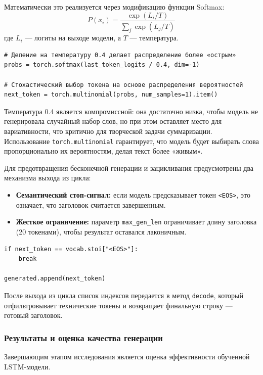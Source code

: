 \documentclass[coursework]{SCWorks}
\begin{document}
    Математически это реализуется через модификацию функции Softmax:
    \[ P(x_i) = \frac{\exp(L_i / T)}{\sum_{j} \exp(L_j / T)} \]
    где $L_i$ — логиты на выходе модели, а $T$ — температура.

    \begin{verbatim}
# Деление на температуру 0.4 делает распределение более «острым»
probs = torch.softmax(last_token_logits / 0.4, dim=-1)

# Стохастический выбор токена на основе распределения вероятностей
next_token = torch.multinomial(probs, num_samples=1).item()
    \end{verbatim}

    Температура 0.4 является компромиссной: она достаточно низка, чтобы модель не генерировала случайный набор слов,
    но при этом оставляет место для вариативности, что критично для творческой задачи суммаризации.
    Использование \texttt{torch.multinomial} гарантирует, что модель будет выбирать слова пропорционально их вероятностям,
    делая текст более «живым».

    Для предотвращения бесконечной генерации и зацикливания предусмотрены два механизма выхода из цикла:
    \begin{itemize}
        \item \textbf{Семантический стоп-сигнал:} если модель предсказывает токен \texttt{<EOS>}, это означает, что заголовок считается завершенным.
        \item \textbf{Жесткое ограничение:} параметр \texttt{max\_gen\_len} ограничивает длину заголовка (20 токенами), чтобы результат оставался лаконичным.
    \end{itemize}

    \begin{verbatim}
if next_token == vocab.stoi["<EOS>"]:
    break

generated.append(next_token)
    \end{verbatim}

    После выхода из цикла список индексов передается в метод \texttt{decode}, который отфильтровывает технические токены и возвращает финальную строку — готовый заголовок.

    \subsubsection{Результаты и оценка качества генерации}

    Завершающим этапом исследования является оценка эффективности обученной LSTM-модели.
\end{document}
